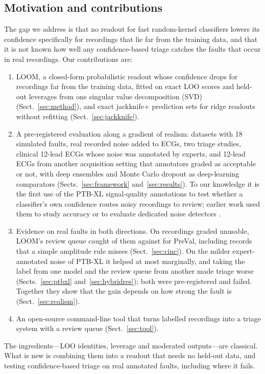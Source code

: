\documentclass[preprint,12pt,authoryear]{elsarticle}
\begin{document}
\subsection{Motivation and contributions}\label{sec:contrib}

The gap we address is that no readout for fast random-kernel classifiers lowers its confidence specifically for recordings that lie far from the training data, and that it is not known how well any confidence-based triage catches the faults that occur in real recordings. Our contributions are:
\begin{enumerate}
\item LOOM, a closed-form probabilistic readout whose confidence drops for recordings far from the training data, fitted on exact LOO scores and held-out leverages from one singular value decomposition (SVD) (Sect.~\ref{sec:method}), and exact jackknife+ prediction sets for ridge readouts without refitting (Sect.~\ref{sec:jackknife}).
\item A pre-registered evaluation along a gradient of realism: \NDatasets{} datasets with 18 simulated faults, real recorded noise added to ECGs, two triage studies, \PTBN{} clinical 12-lead ECGs whose noise was annotated by experts, and \CincN{} 12-lead ECGs from another acquisition setting that annotators graded as acceptable or not, with deep ensembles and Monte Carlo dropout as deep-learning comparators (Sects.~\ref{sec:framework} and~\ref{sec:results}). To our knowledge it is the first use of the PTB-XL signal-quality annotations to test whether a classifier's own confidence routes noisy recordings to review; earlier work used them to study accuracy or to evaluate dedicated noise detectors \citep{bender2023noise,han2025diffusion}.
\item Evidence on real faults in both directions. On recordings graded unusable, LOOM's review queue caught \CincHTwelveCaughtLoom{} of them against \CincHTwelveCaughtPreVal{} for PreVal, including records that a simple amplitude rule misses (Sect.~\ref{sec:cinc}). On the milder expert-annotated noise of PTB-XL it helped at most marginally, and taking the label from one model and the review queue from another made triage worse (Sects.~\ref{sec:ptbxl} and~\ref{sec:hybridres}); both were pre-registered and failed. Together they show that the gain depends on how strong the fault is (Sect.~\ref{sec:realism}).
\item An open-source command-line tool that turns labelled recordings into a triage system with a review queue (Sect.~\ref{sec:tool}).
\end{enumerate}
The ingredients---LOO identities, leverage and moderated outputs---are classical. What is new is combining them into a readout that needs no held-out data, and testing confidence-based triage on real annotated faults, including where it fails.
\end{document}
